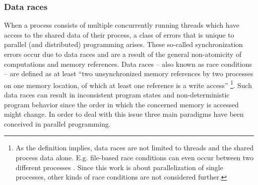 \subsubsection{Data races}
When a process consists of multiple concurrently running threads which have access to the shared data of their process, a class of errors that is unique to parallel (and distributed) programming arises. These so-called synchronization errors occur due to data races and are a result of the general non-atomicity of computations and memory references. Data races -- also known as race conditions -- are defined as at least ``two unsynchronized memory references by two processes on one memory location, of which at least one reference is a write access'' \cite[p.~327]{ParallelComputing}\footnote{As the definition implies, data races are not limited to threads and the shared process data alone. E.g. file-based race conditions can even occur between two different processes \cite{OfficialISC2Guide}. Since this work is about parallelization of single processes, other kinds of race conditions are not considered further.}. Such data races can result in inconsistent program states and non-deterministic program behavior since the order in which the concerned memory is accessed might change. In order to deal with this issue three main paradigms have been conceived in parallel programming.

